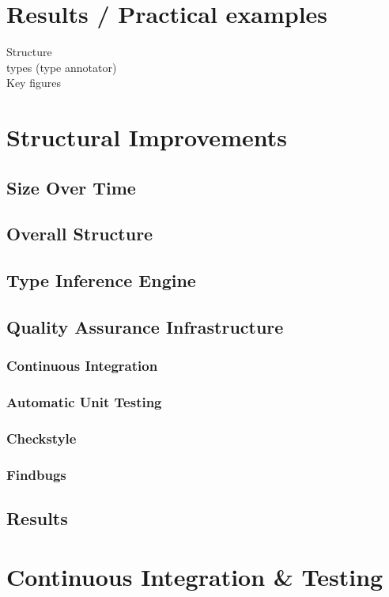\documentclass[12pt,halfparskip,DIV11,BCOR10mm]{scrreprt}
\begin{document}
\chapter{Results / Practical examples}

Structure \\
types (type annotator)\\
Key figures



\chapter{Structural Improvements}
\section{Size Over Time}
\section{Overall Structure}
\section{Type Inference Engine}
\section{Quality Assurance Infrastructure}
\subsection{Continuous Integration}
\subsection{Automatic Unit Testing}
\subsection{Checkstyle}
\subsection{Findbugs}
\section{Results}

\chapter{Continuous Integration \& Testing}
\end{document}
